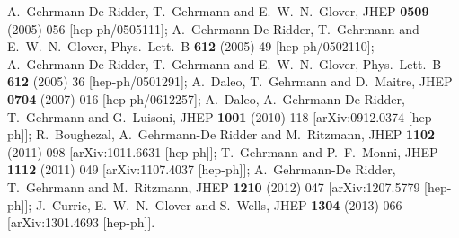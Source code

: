 \documentclass[12pt]{article}
\begin{document}
\begin{thebibliography}{99}

  A.~Gehrmann-De Ridder, T.~Gehrmann and E.~W.~N.~Glover,
  JHEP {\bf 0509} (2005) 056
  [hep-ph/0505111];
  A.~Gehrmann-De Ridder, T.~Gehrmann and E.~W.~N.~Glover,
  Phys.\ Lett.\ B {\bf 612} (2005) 49
  [hep-ph/0502110];
  A.~Gehrmann-De Ridder, T.~Gehrmann and E.~W.~N.~Glover,
  Phys.\ Lett.\ B {\bf 612} (2005) 36
  [hep-ph/0501291];
  A.~Daleo, T.~Gehrmann and D.~Maitre,
  JHEP {\bf 0704} (2007) 016
  [hep-ph/0612257];
  A.~Daleo, A.~Gehrmann-De Ridder, T.~Gehrmann and G.~Luisoni,
  JHEP {\bf 1001} (2010) 118
  [arXiv:0912.0374 [hep-ph]];
  R.~Boughezal, A.~Gehrmann-De Ridder and M.~Ritzmann,
  JHEP {\bf 1102} (2011) 098
  [arXiv:1011.6631 [hep-ph]];
  T.~Gehrmann and P.~F.~Monni,
  JHEP {\bf 1112} (2011) 049
  [arXiv:1107.4037 [hep-ph]];
  A.~Gehrmann-De Ridder, T.~Gehrmann and M.~Ritzmann,
  JHEP {\bf 1210} (2012) 047
  [arXiv:1207.5779 [hep-ph]];
  J.~Currie, E.~W.~N.~Glover and S.~Wells,
  JHEP {\bf 1304} (2013) 066
  [arXiv:1301.4693 [hep-ph]].
  




\end{thebibliography}
\end{document}
